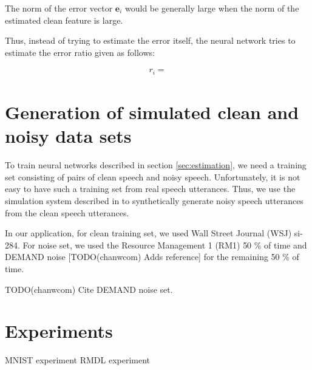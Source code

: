\documentclass{article}
\begin{document}
The norm of the error vector $\boldsymbol{e}_i$ would be generally large when
the norm of the estimated clean feature is large.

Thus, instead of trying to estimate the error itself, the neural network tries to
estimate the error ratio given as follows:

\begin{align}
  r_i = {}{}
\end{align}

\section{Generation of simulated clean and noisy data sets}
\label{gen_inst}

To train neural networks described in section \ref{sec:estimation}, we
need a training set consisting of pairs of clean speech and noisy speech.
Unfortunately, it is not easy to have such a training set from real speech
utterances. Thus, we use the simulation system described in
\cite{C_Kim_INTERSPEECH_2017_1} to synthetically generate noisy speech
utterances from the clean speech utterances.

In our application, for clean training set, we used Wall Street Journal (WSJ)
si-284. For noise set, we used the Resource Management 1 (RM1)
\cite{price_p_ldc_1993} 50 \% of time 
and DEMAND noise [TODO(chanwcom) Adds reference] for the remaining 50 \% of time.

TODO(chanwcom) Cite DEMAND noise set.



\section{Experiments}

MNIST experiment
RMDL experiment \cite{k_kowsari_icisdm_2018_00} 
\cite{c_wei_bmvc_2018_00}




%
%
%
%
%
%
\end{document}

